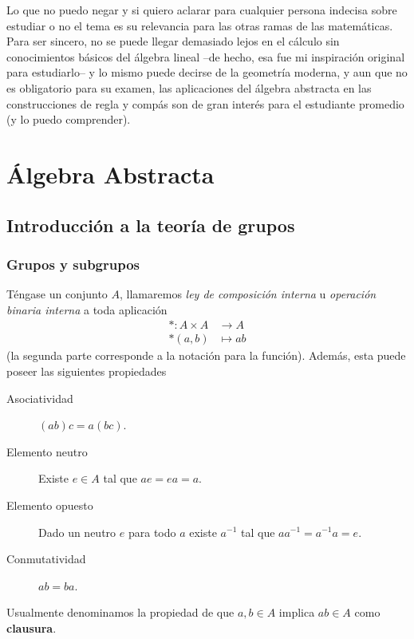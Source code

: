\documentclass[11pt,oneside]{book}
\DeclareMathOperator{\Id}{Id}
\begin{document}
Lo que no puedo negar y si quiero aclarar para cualquier persona indecisa sobre estudiar o no el tema es su relevancia para las otras ramas de las matemáticas. Para ser sincero, no se puede llegar demasiado lejos en el cálculo sin conocimientos básicos del álgebra lineal --de hecho, esa fue mi inspiración original para estudiarlo-- y lo mismo puede decirse de la geometría moderna, y aun que no es obligatorio para su examen, las aplicaciones del álgebra abstracta en las construcciones de regla y compás son de gran interés para el estudiante promedio (y lo puedo comprender).

\mainmatter
\part{Álgebra Abstracta}
\chapter{Introducción a la teoría de grupos}
\section{Grupos y subgrupos}
\nomenclature{$\Id_A$}{Función identidad del conjunto $A$\nomnorefpage}
\begin{mydef}
Téngase un conjunto $A$, llamaremos \textit{ley de composición interna} u \textit{operación binaria interna} a toda aplicación
\begin{align*}
*:A\times A&\longrightarrow A\\
*(a,b)&\longmapsto ab
\end{align*}
(la segunda parte corresponde a la notación para la función). Además, esta puede poseer las siguientes propiedades
\begin{description}
	\item[Asociatividad] $(ab)c=a(bc)$.
	\item[Elemento neutro] Existe $e\in A$ tal que $ae=ea=a$.
	\item[Elemento opuesto] Dado un neutro $e$ para todo $a$ existe $a^{-1}$ tal que $aa^{-1}=a^{-1}a=e$.
	\item[Conmutatividad] $ab=ba$.
\end{description}
\end{mydef}
Usualmente denominamos la propiedad de que $a,b\in A$ implica $ab\in A$ como \textbf{clausura}.
\end{document}
